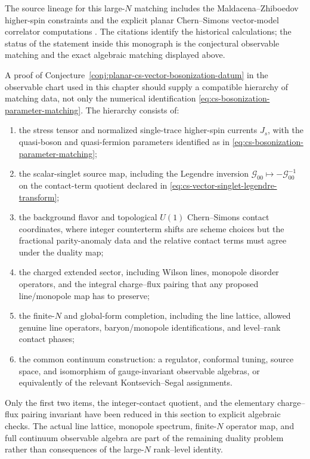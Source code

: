 The source lineage for this large-\(N\) matching includes the
Maldacena--Zhiboedov higher-spin constraints and the explicit planar
Chern--Simons vector-model correlator computations
\cite{MaldacenaZhiboedov2012,AGY2012,JainMinwallaYokoyama2013}.  The
citations identify the historical calculations; the status of the statement
inside this monograph is the conjectural observable matching and the exact algebraic
matching displayed above.

\begin{hypothesis}
\label{hyp:cs-vector-bosonization-hierarchy}
A proof of Conjecture~\ref{conj:planar-cs-vector-bosonization-datum} in the
observable chart used in this chapter should supply a compatible hierarchy of
matching data, not only the numerical identification
\eqref{eq:cs-bosonization-parameter-matching}.  The hierarchy consists of:
\begin{enumerate}
\item the stress tensor and normalized single-trace higher-spin currents
  \(J_s\), with the quasi-boson and quasi-fermion parameters identified as in
  \eqref{eq:cs-bosonization-parameter-matching};
\item the scalar-singlet source map, including the Legendre inversion
  \(\mathcal G_{00}\mapsto-\mathcal G_{00}^{-1}\) on the contact-term
  quotient declared in \eqref{eq:cs-vector-singlet-legendre-transform};
\item the background flavor and topological \(U(1)\) Chern--Simons contact
  coordinates, where integer counterterm shifts are scheme choices but the
  fractional parity-anomaly data and the relative contact terms must agree
  under the duality map;
\item the charged extended sector, including Wilson lines, monopole disorder
  operators, and the integral charge--flux pairing that any proposed
  line/monopole map has to preserve;
\item the finite-\(N\) and global-form completion, including the line lattice,
  allowed genuine line operators, baryon/monopole identifications, and
  level--rank contact phases;
\item the common continuum construction: a regulator, conformal tuning,
  source space, and isomorphism of gauge-invariant observable algebras, or
  equivalently of the relevant Kontsevich--Segal assignments.
\end{enumerate}
Only the first two items, the integer-contact quotient, and the elementary
charge--flux pairing invariant have been reduced in this section to explicit
algebraic checks.  The actual line lattice, monopole spectrum, finite-\(N\)
operator map, and full continuum observable algebra are part of the remaining
duality problem rather than consequences of the large-\(N\) rank--level
identity.
\end{hypothesis}

